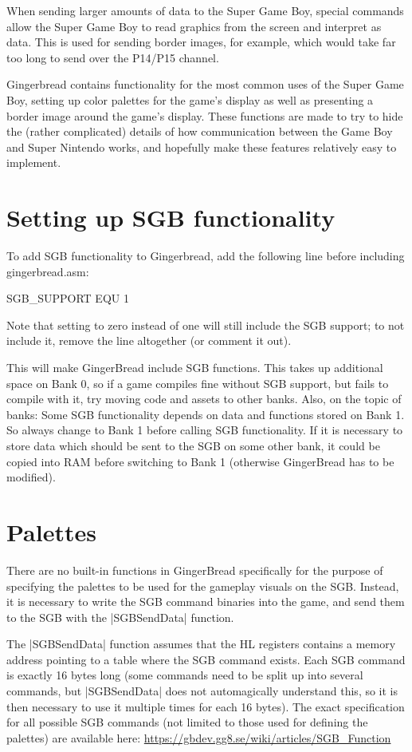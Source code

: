 \documentclass[11pt]{book}
\begin{document}
When sending larger amounts of data to the Super Game Boy, special commands allow the Super Game Boy to read graphics from the screen and interpret as data. This is used for sending border images, for example, which would take far too long to send over the P14/P15 channel.

Gingerbread contains functionality for the most common uses of the Super Game Boy, setting up color palettes for the game's display as well as presenting a border image around the game's display. These functions are made to try to hide the (rather complicated) details of how communication between the Game Boy and Super Nintendo works, and hopefully make these features relatively easy to implement.

\section{Setting up SGB functionality}
To add SGB functionality to Gingerbread, add the following line before including gingerbread.asm:

\begin{code}
SGB_SUPPORT EQU 1
\end{code}

Note that setting to zero instead of one will still include the SGB support; to not include it, remove the line altogether (or comment it out).

This will make GingerBread include SGB functions. This takes up additional space on Bank 0, so if a game compiles fine without SGB support, but fails to compile with it, try moving code and assets to other banks. Also, on the topic of banks: Some SGB functionality depends on data and functions stored on Bank 1. So always change to Bank 1 before calling SGB functionality. If it is necessary to store data which should be sent to the SGB on some other bank, it could be copied into RAM before switching to Bank 1 (otherwise GingerBread has to be modified).

\section{Palettes}
There are no built-in functions in GingerBread specifically for the purpose of specifying the palettes to be used for the gameplay visuals on the SGB. Instead, it is necessary to write the SGB command binaries into the game, and send them to the SGB with the |SGBSendData| function. 

The |SGBSendData| function assumes that the HL registers contains a memory address pointing to a table where the SGB command exists. Each SGB command is exactly 16 bytes long (some commands need to be split up into several commands, but |SGBSendData| does not automagically understand this, so it is then necessary to use it multiple times for each 16 bytes). The exact specification for all possible SGB commands (not limited to those used for defining the palettes) are available here: \url{https://gbdev.gg8.se/wiki/articles/SGB_Function}
\end{document}
